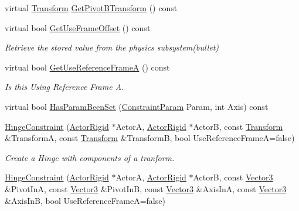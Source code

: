 \begin{DoxyCompactItemize}
virtual \hyperlink{classMezzanine_1_1Transform}{Transform} \hyperlink{classMezzanine_1_1HingeConstraint_a7d9a9ddc367d1a9105f1eb27fd76a65f}{GetPivotBTransform} () const 
\item 
virtual bool \hyperlink{classMezzanine_1_1HingeConstraint_a09dc1bb27e02b619222aebea91bc6705}{GetUseFrameOffset} () const 
\begin{DoxyCompactList}\small\item\em Retrieve the stored value from the physics subsystem(bullet) \item\end{DoxyCompactList}\item 
virtual bool \hyperlink{classMezzanine_1_1HingeConstraint_a638b7b76542d850becea2d49d3f1c8b1}{GetUseReferenceFrameA} () const 
\begin{DoxyCompactList}\small\item\em Is this Using Reference Frame A. \item\end{DoxyCompactList}\item 
virtual bool \hyperlink{classMezzanine_1_1HingeConstraint_a58f5758cb5926f785c07c7ebb544d91b}{HasParamBeenSet} (\hyperlink{namespaceMezzanine_a6c62e8c2938fb203eb7a7072c12176f4}{ConstraintParam} Param, int Axis) const 
\item 
\hyperlink{classMezzanine_1_1HingeConstraint_af769aacbd1756b528fe8724ecf5fc654}{HingeConstraint} (\hyperlink{classMezzanine_1_1ActorRigid}{ActorRigid} $\ast$ActorA, \hyperlink{classMezzanine_1_1ActorRigid}{ActorRigid} $\ast$ActorB, const \hyperlink{classMezzanine_1_1Transform}{Transform} \&TransformA, const \hyperlink{classMezzanine_1_1Transform}{Transform} \&TransformB, bool UseReferenceFrameA=false)
\begin{DoxyCompactList}\small\item\em Create a Hinge with components of a tranform. \item\end{DoxyCompactList}\item 
\hyperlink{classMezzanine_1_1HingeConstraint_a65d04021f0ac11d284de975d7552012e}{HingeConstraint} (\hyperlink{classMezzanine_1_1ActorRigid}{ActorRigid} $\ast$ActorA, \hyperlink{classMezzanine_1_1ActorRigid}{ActorRigid} $\ast$ActorB, const \hyperlink{classMezzanine_1_1Vector3}{Vector3} \&PivotInA, const \hyperlink{classMezzanine_1_1Vector3}{Vector3} \&PivotInB, const \hyperlink{classMezzanine_1_1Vector3}{Vector3} \&AxisInA, const \hyperlink{classMezzanine_1_1Vector3}{Vector3} \&AxisInB, bool UseReferenceFrameA=false)

\end{DoxyCompactItemize}

